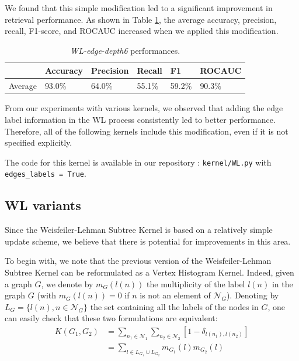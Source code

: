 \documentclass{IEEEtran}
\begin{document}
We found that this simple modification led to a significant improvement in retrieval performance.
As shown in Table \ref{tab:wldepth6edge}, the average accuracy, precision, recall, F1-score, and ROCAUC increased when we applied this modification.


\begin{table}[h]
    \centering
    \begin{tabular}{l|llll|l}
                & Accuracy & Precision & Recall & F1     & ROCAUC \\
        \hline
        Average & 93.0\%   & 64.0\%    & 55.1\% & 59.2\% & 90.3\% \\
    \end{tabular}
    \caption{\emph{WL-edge-depth6} performances.}
    \label{tab:wldepth6edge}
\end{table}

From our experiments with various kernels, we observed that adding the edge label information in the WL process consistently led to better performance. Therefore, all of the following kernels include this modification, even if it is not specified explicitly.

The code for this kernel is available in our repository : \texttt{kernel/WL.py}
with \texttt{edges\_labels = True}.

\subsection{WL variants}
Since the Weisfeiler-Lehman Subtree Kernel is based on a relatively simple update scheme,
we believe that there is potential for improvements in this area.

To begin with, we note that the previous version of the Weisfeiler-Lehman Subtree Kernel can be reformulated
as a Vertex Histogram Kernel. Indeed,
given a graph $G$, we denote by $m_G(l(n))$ the multiplicity of
the label $l(n)$ in the graph $G$ (with $m_G(l(n)) = 0$ if $n$ is not an
element of $\mathcal N_G$). Denoting by $L_G = \{l(n), n \in \mathcal N_G\}$
the set containing all the labels of the nodes in $G$,
one can easily check that these two formulations are equivalent:
\begin{equation*}
    \begin{split}
        K(G_1, G_2) & = \sum_{n_1 \in \mathcal{N}_1} \sum_{n_2 \in \mathcal{N}_2} [1 - \delta_{l(n_1), l(n_2)}]\\
        &= \sum_{l \in L_{G_1} \cup L_{G_2}} m_{G_1}(l)m_{G_2}(l)
    \end{split}
\end{equation*}
\end{document}
